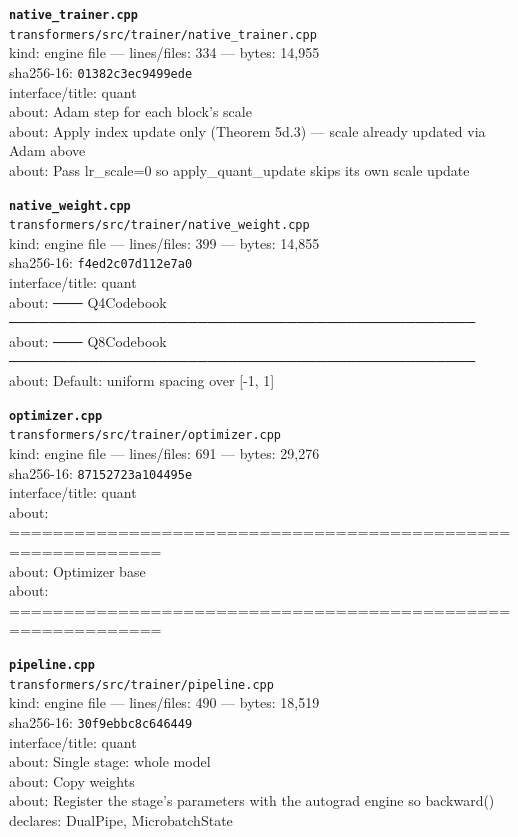 \noindent\textbf{\texttt{native\_trainer.cpp}}\\
\texttt{transformers/src/trainer/native\_trainer.cpp}\\
kind: engine file --- lines/files: 334 --- bytes: 14,955\\
sha256-16: \texttt{01382c3ec9499ede}\\
interface/title: quant\\
about: Adam step for each block's scale\\
about: Apply index update only (Theorem 5d.3) — scale already updated via Adam above\\
about: Pass lr\_scale=0 so apply\_quant\_update skips its own scale update\\
\vspace*{6.0pt}

\noindent\textbf{\texttt{native\_weight.cpp}}\\
\texttt{transformers/src/trainer/native\_weight.cpp}\\
kind: engine file --- lines/files: 399 --- bytes: 14,855\\
sha256-16: \texttt{f4ed2c07d112e7a0}\\
interface/title: quant\\
about: ─── Q4Codebook ───────────────────────────────────────────────\\
about: ─── Q8Codebook ───────────────────────────────────────────────\\
about: Default: uniform spacing over [-1, 1]\\
\vspace*{6.0pt}
\newpage

\noindent\textbf{\texttt{optimizer.cpp}}\\
\texttt{transformers/src/trainer/optimizer.cpp}\\
kind: engine file --- lines/files: 691 --- bytes: 29,276\\
sha256-16: \texttt{87152723a104495e}\\
interface/title: quant\\
about: ============================================================\\
about: Optimizer base\\
about: ============================================================\\
\vspace*{6.0pt}

\noindent\textbf{\texttt{pipeline.cpp}}\\
\texttt{transformers/src/trainer/pipeline.cpp}\\
kind: engine file --- lines/files: 490 --- bytes: 18,519\\
sha256-16: \texttt{30f9ebbc8c646449}\\
interface/title: quant\\
about: Single stage: whole model\\
about: Copy weights\\
about: Register the stage's parameters with the autograd engine so backward()\\
declares: DualPipe, MicrobatchState\\
\vspace*{6.0pt}

